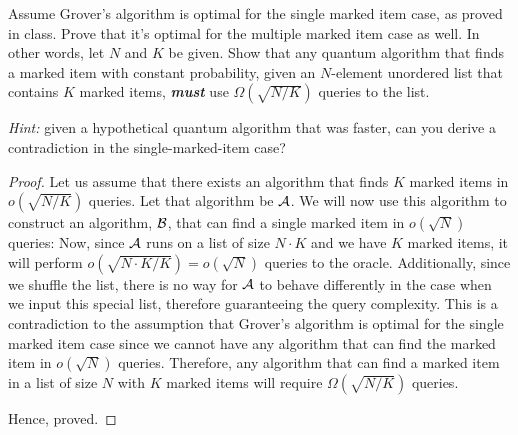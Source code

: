 \begin{solution}[label=ques:3b]
  \begin{question}
    Assume Grover's algorithm is optimal for the single marked item case, as proved in class.  Prove that it's optimal for the multiple marked item case as well.  In other words, let $N$ and $K$ be given.  Show that any quantum algorithm that finds a marked item with constant probability, given an $N$-element unordered list that contains $K$ marked items, \emph{\textbf{must}} use $\Omega({\sqrt{N/K}})$ queries to the list.  

\noindent \emph{Hint:} given a hypothetical quantum algorithm that was faster, can you derive a contradiction in the single-marked-item case?
  \end{question}
  \tcblower{}
  \begin{proof}[Proof]
    Let us assume that there exists an algorithm that finds $K$ marked items in $o(\sqrt{N/K})$ queries. Let that algorithm be $\mathcal{A}$. We will now use this algorithm to construct an algorithm, $\mathcal{B}$, that can find a single marked item in $o(\sqrt{N})$ queries:
    Now, since $\mathcal{A}$ runs on a list of size $N\cdot K$ and we have $K$ marked items, it will perform $o(\sqrt{N\cdot K / K}) = o(\sqrt{N})$ queries to the oracle. Additionally, since we shuffle the list, there is no way for $\mathcal{A}$ to behave differently in the case when we input this special list, therefore guaranteeing the query complexity. This is a contradiction to the assumption that Grover's algorithm is optimal for the single marked item case since we cannot have any algorithm that can find the marked item in $o(\sqrt{N})$ queries. Therefore, any algorithm that can find a marked item in a list of size $N$ with $K$ marked items will require $\Omega(\sqrt{N/K})$ queries.\par
    Hence, proved.
  \end{proof}
\end{solution}

